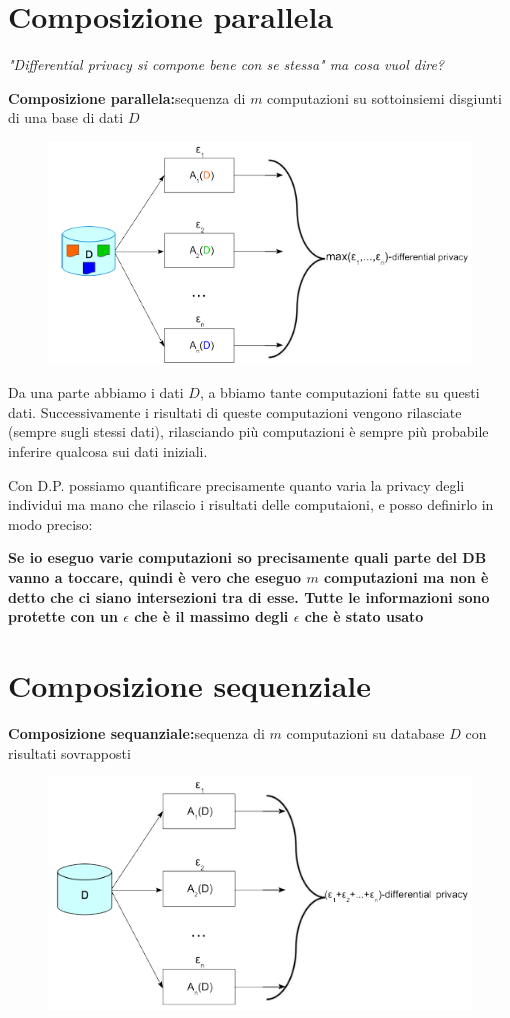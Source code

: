 \documentclass{report}
\begin{document}
\section{Composizione parallela}
\begin{center}
    \textit{"Differential privacy si compone bene con se stessa" ma cosa vuol dire?}
\end{center}
\noindent \textbf{Composizione parallela:}sequenza di $m$ computazioni su sottoinsiemi disgiunti di una base di dati $D$

\begin{figure}[H]
        \centering
        \includegraphics[width=0.4\linewidth]{images/ParallelC.png}
\end{figure}


\noindent Da una parte abbiamo i dati $D$, a bbiamo tante computazioni fatte su questi dati. Successivamente i risultati di queste computazioni vengono rilasciate
(sempre sugli stessi dati), rilasciando più computazioni è sempre più probabile inferire qualcosa sui dati iniziali.

\noindent Con D.P. possiamo quantificare precisamente quanto varia la privacy degli individui ma mano che rilascio i risultati delle computaioni, e posso definirlo in modo preciso:

\noindent \textbf{Se io eseguo varie computazioni so precisamente quali parte del DB vanno a toccare, quindi è vero che eseguo $m$ computazioni ma non è detto che ci siano intersezioni tra di esse.
Tutte le informazioni sono protette con un $\epsilon$ che è il massimo degli $\epsilon$ che è stato usato}

\section{Composizione sequenziale}
\noindent \textbf{Composizione sequanziale:}sequenza di $m$ computazioni su database $D$ con risultati sovrapposti

\begin{figure}[H]
        \centering
        \includegraphics[width=0.4\linewidth]{images/sequenziale.png}
\end{figure}
\end{document}
